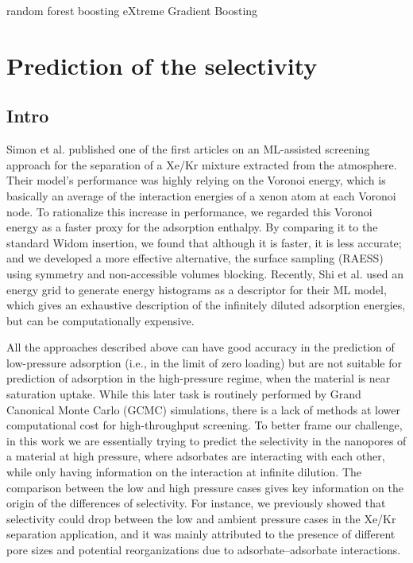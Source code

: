 \documentclass[main]{subfiles}
\begin{document}
random forest 
boosting
eXtreme Gradient Boosting

\section{Prediction of the selectivity}

\subsection{Intro}

Simon et al. published one of the first articles on an ML-assisted screening approach for the separation of a Xe/Kr mixture extracted from the atmosphere.\cite{Simon_2015} Their model's performance was highly relying on the Voronoi energy, which is basically an average of the interaction energies of a xenon atom at each Voronoi node.\cite{Rycroft_2009} To rationalize this increase in performance, we regarded this Voronoi energy as a faster proxy for the adsorption enthalpy. By comparing it to the standard Widom insertion, we found that although it is faster, it is less accurate; and we developed a more effective alternative, the surface sampling (RAESS) using symmetry and non-accessible volumes blocking.\cite{Ren_2023} Recently, Shi et al. used an energy grid to generate energy histograms as a descriptor for their ML model, which gives an exhaustive description of the infinitely diluted adsorption energies,\cite{Shi_2023} but can be computationally expensive.

All the approaches described above can have good accuracy in the prediction of low-pressure adsorption (i.e., in the limit of zero loading) but are not suitable for prediction of adsorption in the high-pressure regime, when the material is near saturation uptake. While this later task is routinely performed by Grand Canonical Monte Carlo (GCMC) simulations, there is a lack of methods at lower computational cost for high-throughput screening. To better frame our challenge, in this work we are essentially trying to predict the selectivity in the nanopores of a material at high pressure, where adsorbates are interacting with each other, while only having information on the interaction at infinite dilution. The comparison between the low and high pressure cases gives key information on the origin of the differences of selectivity. For instance, we previously showed that selectivity could drop between the low and ambient pressure cases in the Xe/Kr separation application, and it was mainly attributed to the presence of different pore sizes and potential reorganizations due to adsorbate--adsorbate interactions.\cite{Ren_2021}
\end{document}
